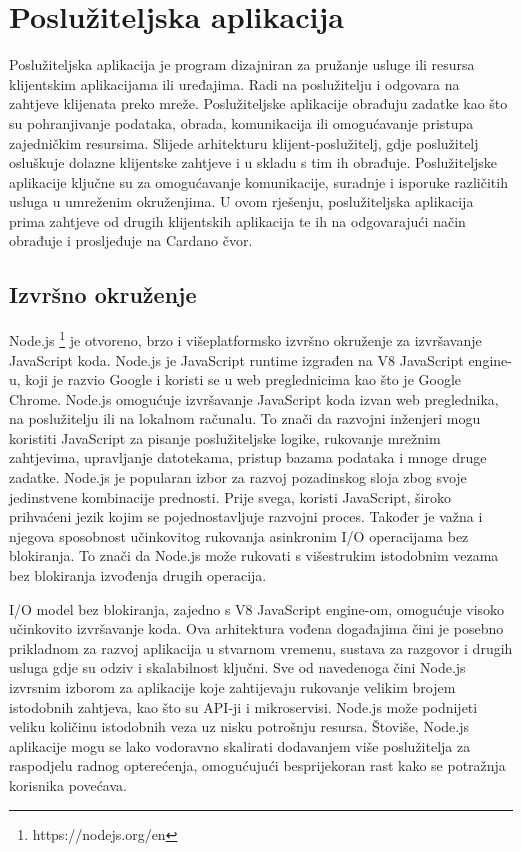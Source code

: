 \documentclass[times, utf8, diplomski]{fer}
\begin{document}
\section{Poslužiteljska aplikacija}

Poslužiteljska aplikacija je program dizajniran za pružanje usluge ili resursa klijentskim aplikacijama ili uređajima. Radi na poslužitelju i odgovara na zahtjeve klijenata preko mreže. Poslužiteljske aplikacije obrađuju zadatke kao što su pohranjivanje podataka, obrada, komunikacija ili omogućavanje pristupa zajedničkim resursima. Slijede arhitekturu klijent-poslužitelj, gdje poslužitelj osluškuje dolazne klijentske zahtjeve i u skladu s tim ih obrađuje. Poslužiteljske aplikacije ključne su za omogućavanje komunikacije, suradnje i isporuke različitih usluga u umreženim okruženjima. U ovom rješenju, poslužiteljska aplikacija prima zahtjeve od drugih klijentskih aplikacija te ih  na odgovarajući način obrađuje i prosljeđuje na Cardano čvor.

\subsection{Izvršno okruženje}

Node.js \footnote{https://nodejs.org/en} je otvoreno, brzo i višeplatformsko izvršno okruženje za izvršavanje JavaScript koda. Node.js je JavaScript runtime izgrađen na V8 JavaScript engine-u, koji je razvio Google i koristi se u web preglednicima kao što je Google Chrome. Node.js omogućuje izvršavanje JavaScript koda izvan web preglednika, na poslužitelju ili na lokalnom računalu. To znači da razvojni inženjeri mogu koristiti JavaScript za pisanje poslužiteljske logike, rukovanje mrežnim zahtjevima, upravljanje datotekama, pristup bazama podataka i mnoge druge zadatke. Node.js je popularan izbor za razvoj pozadinskog sloja zbog svoje jedinstvene kombinacije prednosti. Prije svega, koristi JavaScript, široko prihvaćeni jezik kojim se pojednostavljuje razvojni proces. Također je važna i njegova sposobnost učinkovitog rukovanja asinkronim I/O operacijama bez blokiranja. To znači da Node.js može rukovati s višestrukim istodobnim vezama bez blokiranja izvođenja drugih operacija.

I/O model bez blokiranja, zajedno s V8 JavaScript engine-om, omogućuje visoko učinkovito izvršavanje koda. Ova arhitektura vođena događajima čini je posebno prikladnom za razvoj aplikacija u stvarnom vremenu, sustava za razgovor i drugih usluga gdje su odziv i skalabilnost ključni. Sve od navedenoga čini Node.js izvrsnim izborom za aplikacije koje zahtijevaju rukovanje velikim brojem istodobnih zahtjeva, kao što su API-ji i mikroservisi. Node.js može podnijeti veliku količinu istodobnih veza uz nisku potrošnju resursa. Štoviše, Node.js aplikacije mogu se lako vodoravno skalirati dodavanjem više poslužitelja za raspodjelu radnog opterećenja, omogućujući besprijekoran rast kako se potražnja korisnika povećava.
\end{document}
